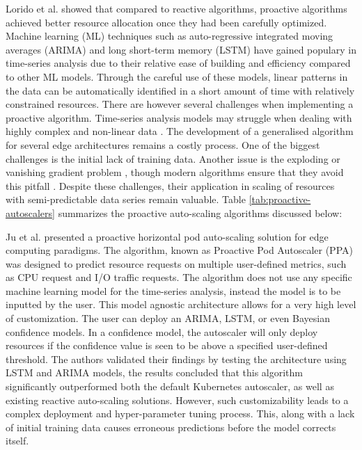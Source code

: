 Lorido et al. \cite{lorido2014review} showed that compared to reactive algorithms, proactive algorithms achieved better resource allocation once they had been carefully optimized. Machine learning (ML) techniques such as auto-regressive integrated moving averages (ARIMA) and long short-term memory (LSTM) have gained populary in time-series analysis due to their relative ease of building and efficiency compared to other ML models. Through the careful use of these models, linear patterns in the data can be automatically identified in a short amount of time with relatively constrained resources. There are however several challenges when implementing a proactive algorithm. Time-series analysis models may struggle when dealing with highly complex and non-linear data \cite{dogani2023auto}. The development of a generalised algorithm for several edge architectures remains a costly process. One of the biggest challenges is the initial lack of training data. Another issue is the exploding or vanishing gradient problem \cite{pascanu2013difficulty}, though modern algorithms ensure that they avoid this pitfall \cite{hochreiter2001gradient}. Despite these challenges, their application in scaling of resources with semi-predictable data series remain valuable. Table \ref{tab:proactive-autoscalers} summarizes the proactive auto-scaling algorithms discussed below:\par

Ju et al. \cite{ju2021proactive} presented a proactive horizontal pod auto-scaling solution for edge computing paradigms. The algorithm, known as Proactive Pod Autoscaler (PPA) was designed to predict resource requests on multiple user-defined metrics, such as CPU request and I/O traffic requests. The algorithm does not use any specific machine learning model for the time-series analysis, instead the model is to be inputted by the user. This model agnostic architecture allows for a very high level of customization. The user can deploy an ARIMA, LSTM, or even Bayesian confidence models. In a confidence model, the autoscaler will only deploy resources if the confidence value is seen to be above a specified user-defined threshold. The authors validated their findings by testing the architecture using LSTM and ARIMA models, the results concluded that this algorithm significantly outperformed both the default Kubernetes autoscaler, as well as existing reactive auto-scaling solutions. However, such customizability leads to a complex deployment and hyper-parameter tuning process. This, along with a lack of initial training data causes erroneous predictions before the model corrects itself.\par


